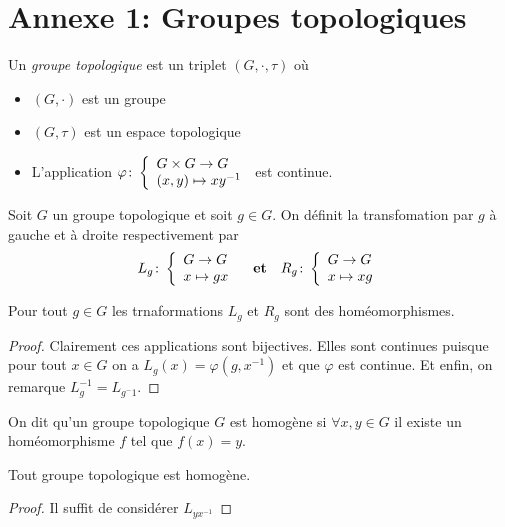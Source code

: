 \chapter*{Annexe 1: Groupes topologiques}


\begin{definition}
    Un \emph{groupe topologique} est un triplet $(G,\cdot,\tau)$ où
    \begin{itemize}
        \item $(G,\cdot)$ est un groupe
        \item $(G,\tau)$ est un espace topologique
        \item L'application $\varphi\colon \left\{\begin{array}{l}G\times G \to G \\(x,y)\mapsto xy^{-1}\end{array}\right.$ est continue. 
    \end{itemize}
\end{definition}

Soit $G$ un groupe topologique et soit $g\in G$. On définit la transfomation par $g$ à gauche et à droite respectivement par 
\[
L_g\colon \left\{\begin{array}{l}G\to G \\x\mapsto gx\end{array}\right. \quad \textbf{et} \quad  R_g\colon \left\{\begin{array}{l}G\to G \\x\mapsto xg\end{array}\right.
\]
\begin{proposition}
    Pour tout $g\in G$ les trnaformations $L_g$ et $R_g$ sont des homéomorphismes.
\end{proposition}

\begin{proof}
    Clairement ces applications sont bijectives. Elles sont continues puisque  pour tout $x\in G$ on a $ L_g(x)=\varphi(g,x^{-1})$ et que $\varphi $ est continue. Et enfin, on remarque $L_g^{-1}=L_{g^-1}$.
\end{proof}

On dit qu'un groupe topologique $G$ est homogène si $\forall x,y\in G$ il existe un homéomorphisme $f$ tel que $f(x)=y$.

\begin{proposition}
    Tout groupe topologique est homogène.
\end{proposition}

\begin{proof}
    Il suffit de considérer $L_{yx^{-1}}$
\end{proof}